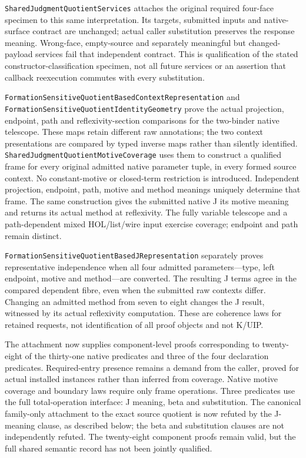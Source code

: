 \documentclass[11pt]{article}
\theoremstyle{definition}
\theoremstyle{remark}
\begin{document}
\nolinkurl{SharedJudgmentQuotientServices} attaches the original required
four-face specimen to this same interpretation. Its targets, submitted inputs
and native-surface contract are unchanged; actual caller substitution preserves
the response meaning. Wrong-face, empty-source and separately meaningful but
changed-payload services fail that independent contract. This is qualification
of the stated constructor-classification specimen, not all future services or
an assertion that callback reexecution commutes with every substitution.

\nolinkurl{FormationSensitiveQuotientBasedContextRepresentation} and
\nolinkurl{FormationSensitiveQuotientIdentityGeometry} prove the actual
projection, endpoint, path and reflexivity-section comparisons for the
two-binder native telescope. These maps retain different raw annotations;
the two context presentations are compared by typed inverse maps rather
than silently identified.
\nolinkurl{SharedJudgmentQuotientMotiveCoverage} uses them to construct a
qualified frame for every original admitted native parameter tuple, in
every formed source context. No constant-motive or closed-term restriction
is introduced. Independent projection, endpoint, path, motive and method
meanings uniquely determine that frame. The same construction gives the
submitted native J its motive meaning and returns its actual method at
reflexivity. The fully variable telescope and a path-dependent mixed
HOL/list/wire input exercise coverage; endpoint and path remain distinct.

\nolinkurl{FormationSensitiveQuotientBasedJRepresentation} separately proves
representative independence when all four admitted parameters---type,
left endpoint, motive and method---are converted. The resulting J terms
agree in the compared dependent fibre, even when the submitted raw
contexts differ. Changing an admitted method from seven to eight changes
the J result, witnessed by its actual reflexivity computation. These are
coherence laws for retained requests, not identification of all proof
objects and not K/UIP.

The attachment now supplies component-level proofs corresponding to twenty-eight
of the thirty-one native predicates and three of the four declaration
predicates. Required-entry presence remains a demand from the caller, proved
for actual installed instances rather than inferred from coverage. Native
motive coverage and boundary laws require only frame operations. Three
predicates use the full total-operation interface: J meaning, beta and
substitution. The canonical family-only attachment to the exact source
quotient is now refuted by the J-meaning clause, as described below;
the beta and substitution clauses are not independently refuted. The
twenty-eight component proofs remain valid, but the full shared semantic
record has not been jointly qualified.
\end{document}
